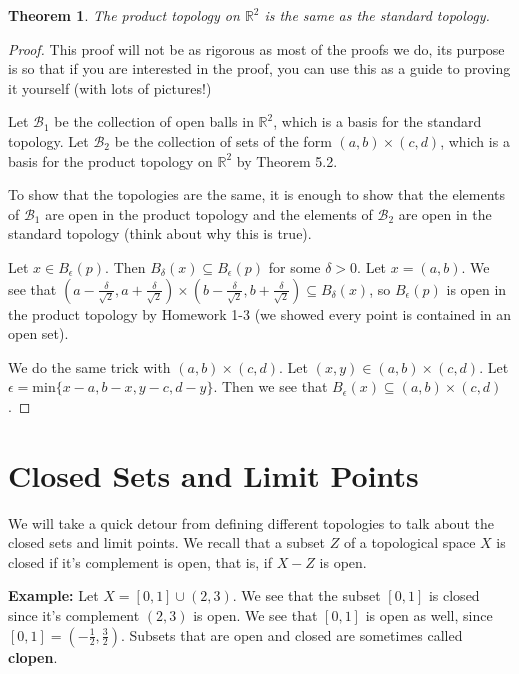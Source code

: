 \documentclass[a4paper]{article}
\newtheorem{theorem}{Theorem}
\numberwithin{theorem}{section}
\begin{document}
\begin{theorem}
The product topology on $\mathbb{R}^2$ is the same as the standard topology.
\end{theorem}

\begin{proof}
This proof will not be as rigorous as most of the proofs we do, its purpose is so that if you are interested in the proof, you can use this as a guide to proving it yourself (with lots of pictures!)

Let $\mathcal{B}_1$ be the collection of open balls in $\mathbb{R}^2$, which is a basis for the standard topology. Let $\mathcal{B}_2$ be the collection of sets of the form $(a,b)\times (c,d)$, which is a basis for the product topology on $\mathbb{R}^2$ by Theorem 5.2.

To show that the topologies are the same, it is enough to show that the elements of $\mathcal{B}_1$ are open in the product topology and the elements of $\mathcal{B}_2$ are open in the standard topology (think about why this is true). 

Let $x \in B_\epsilon(p)$. Then $B_\delta(x) \subseteq B_\epsilon(p)$ for some $\delta > 0$. Let $x = (a,b)$. We see that $(a-\frac{\delta}{\sqrt{2}},a+\frac{\delta}{\sqrt{2}}) \times (b-\frac{\delta}{\sqrt{2}},b+\frac{\delta}{\sqrt{2}}) \subseteq B_\delta(x)$, so $B_\epsilon(p)$ is open in the product topology by Homework 1-3 (we showed every point is contained in an open set).

We do the same trick with $(a,b)\times (c,d)$. Let $(x,y) \in (a,b)\times (c,d)$. Let $\epsilon = \textrm{min}\{x-a,b-x,y-c,d-y  \}$. Then we see that $B_\epsilon(x) \subseteq (a,b)\times (c,d)$.

\end{proof}

\section{Closed Sets and Limit Points}

We will take a quick detour from defining different topologies to talk about the closed sets and limit points. We recall that a subset $Z$ of a topological space $X$ is closed if it's complement is open, that is, if $X - Z$ is open. 

\textbf{Example:} Let $X = [0,1] \cup (2,3)$. We see that the subset $[0,1]$ is closed since it's complement $(2,3)$ is open. We see that $[0,1]$ is open as well, since $[0,1] = (-\frac{1}{2}, \frac{3}{2})$. Subsets that are open and closed are sometimes called \textbf{clopen}.
\end{document}
